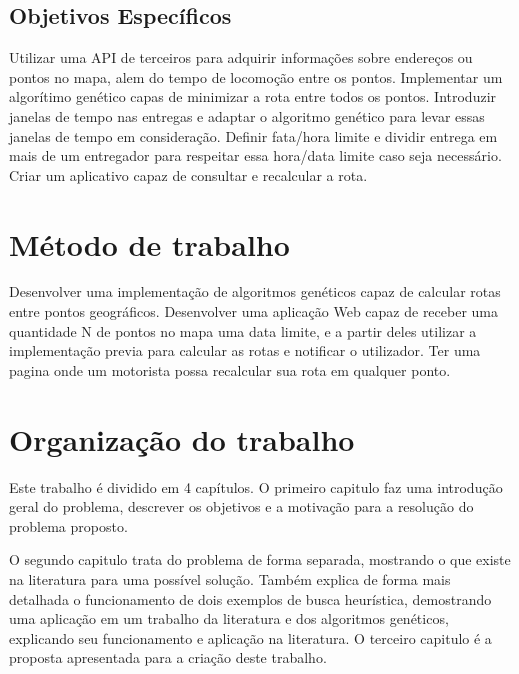 \subsection{Objetivos Específicos}

Utilizar uma API de terceiros para adquirir informações sobre endereços ou pontos no mapa, alem do tempo de locomoção entre os pontos.
Implementar um algorítimo genético capas de minimizar a rota entre todos os pontos.
Introduzir janelas de tempo nas entregas e adaptar o algoritmo genético para levar essas janelas de tempo em consideração.
Definir fata/hora limite e dividir entrega em mais de um entregador para respeitar essa hora/data limite caso seja necessário.
Criar um aplicativo capaz de consultar e recalcular a rota.

\section{Método de trabalho}

Desenvolver uma implementação de algoritmos genéticos capaz de calcular rotas entre pontos geográficos.
Desenvolver uma aplicação Web capaz de receber uma quantidade N de pontos no mapa uma data limite, e a partir deles utilizar a implementação previa para calcular as rotas e 
notificar o utilizador.
Ter uma pagina onde um motorista possa recalcular sua rota em qualquer ponto.

\section{Organização do trabalho}
Este trabalho é dividido em 4 capítulos. O primeiro capitulo faz uma introdução geral do problema, descrever os objetivos e a motivação para a resolução do problema proposto.

O segundo capitulo trata do problema de forma separada, mostrando o que existe na literatura para uma possível solução. Também explica de forma mais detalhada o funcionamento de dois exemplos de busca heurística, demostrando uma aplicação em um trabalho da literatura e dos algoritmos genéticos, explicando seu funcionamento e aplicação na literatura.
O terceiro capitulo é a proposta apresentada para a criação deste trabalho.

